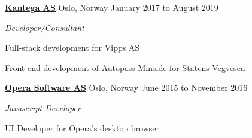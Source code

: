 \documentclass[11pt]{article}
\newenvironment{outerlist}[1][\enskip\textbullet]%
        {\begin{itemize}[#1]}{\end{itemize}%
         \vspace{-.6\baselineskip}}
\newenvironment{innerlist}[1][\enskip\textbullet]%
        {\begin{compactitem}[#1]}{\end{compactitem}}
\newcommand{\blankline}{\quad\pagebreak[2]}
\begin{document}
\href{http://www.kantega.no/}{\textbf{Kantega AS}}
Oslo, Norway
\hfill January 2017 to August 2019
\begin{outerlist}
\item[] \textit{Developer/Consultant}
  \begin{innerlist}
      \footnotesize
    \item Full-stack development for Vipps AS
    \item Front-end development of \href{https://minside.autopass.no/}{Autopass-Minside} for Statens Vegvesen
    \end{innerlist}
\end{outerlist}
\blankline

\href{https://www.opera.com/}{\textbf{Opera Software AS}}
Oslo, Norway
\hfill June 2015 to November 2016
\begin{outerlist}
\item[] \textit{Javascript Developer}
  \begin{innerlist}
      \footnotesize
    \item UI Developer for Opera's desktop browser
  \end{innerlist}
\end{outerlist}
\blankline
\end{document}
